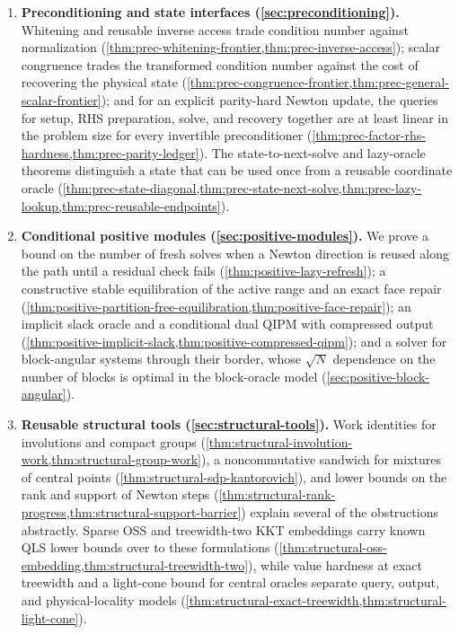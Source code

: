 \begin{enumerate}[leftmargin=*]
 \item \textbf{Preconditioning and state interfaces
 (\cref{sec:preconditioning}).}  Whitening and reusable inverse access trade
 condition number against normalization
 (\cref{thm:prec-whitening-frontier,thm:prec-inverse-access}); scalar
 congruence trades the transformed condition number against the cost of
 recovering the physical state
 (\cref{thm:prec-congruence-frontier,thm:prec-general-scalar-frontier}); and for
 an explicit parity-hard Newton update, the queries for setup, RHS
 preparation, solve, and recovery together are at least linear in the problem
 size for every invertible preconditioner
 (\cref{thm:prec-factor-rhs-hardness,thm:prec-parity-ledger}).  The
 state-to-next-solve and lazy-oracle theorems distinguish a state that can be
 used once from a reusable coordinate oracle
 (\cref{thm:prec-state-diagonal,thm:prec-state-next-solve,thm:prec-lazy-lookup,thm:prec-reusable-endpoints}).

 \item \textbf{Conditional positive modules
 (\cref{sec:positive-modules}).}  We prove a bound on the number of fresh
 solves when a Newton direction is reused along the path until a residual
 check fails (\cref{thm:positive-lazy-refresh}); a constructive stable
 equilibration of the active range and an exact face repair
 (\cref{thm:positive-partition-free-equilibration,thm:positive-face-repair});
 an implicit slack oracle and a conditional dual QIPM with compressed output
 (\cref{thm:positive-implicit-slack,thm:positive-compressed-qipm}); and a
 solver for block-angular systems through their border, whose \(\sqrt N\)
 dependence on the number of blocks is optimal in the block-oracle model
 (\cref{sec:positive-block-angular}).

 \item \textbf{Reusable structural tools
 (\cref{sec:structural-tools}).}  Work identities for involutions and
 compact groups (\cref{thm:structural-involution-work,thm:structural-group-work}),
 a noncommutative sandwich for mixtures of central points
 (\cref{thm:structural-sdp-kantorovich}), and lower bounds on the rank and
 support of Newton steps
 (\cref{thm:structural-rank-progress,thm:structural-support-barrier}) explain
 several of the obstructions abstractly.  Sparse OSS and treewidth-two KKT
 embeddings carry known QLS lower bounds over to these formulations
 (\cref{thm:structural-oss-embedding,thm:structural-treewidth-two}), while
 value hardness at exact treewidth and a light-cone bound for central oracles
 separate query, output, and physical-locality models
 (\cref{thm:structural-exact-treewidth,thm:structural-light-cone}).


\end{enumerate}
